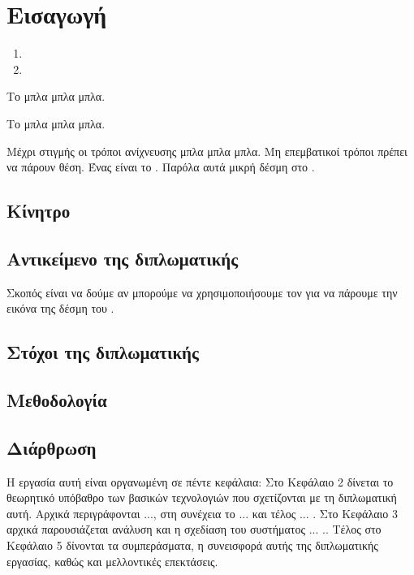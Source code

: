 \chapter{Εισαγωγή}

\begin{enumerate}
\item {}
\item {}
\end{enumerate}

Το  μπλα μπλα μπλα.

Το  μπλα μπλα μπλα.

Μέχρι στιγμής οι τρόποι ανίχνευσης μπλα μπλα μπλα.
Μη επεμβατικοί τρόποι πρέπει να πάρουν θέση. Ένας είναι το . Παρόλα αυτά μικρή δέσμη στο . 

\section{Κίνητρο}


\section{Αντικείμενο της διπλωματικής} %
Σκοπός είναι να δούμε αν μπορούμε να χρησιμοποιήσουμε τον  για να πάρουμε την εικόνα της δέσμη του .

\section{Στόχοι της διπλωματικής}

\section{Μεθοδολογία}

\section{Διάρθρωση} %
Η εργασία αυτή είναι οργανωμένη σε πέντε κεφάλαια: Στο Κεφάλαιο 2
δίνεται το θεωρητικό υπόβαθρο των βασικών τεχνολογιών που
σχετίζονται με τη διπλωματική αυτή. Αρχικά περιγράφονται ..., στη συνέχεια το ... και τέλος ... . 
Στο Κεφάλαιο 3 αρχικά παρουσιάζεται ανάλυση και η σχεδίαση του συστήματος ... .. Τέλος στο Κεφάλαιο 5 δίνονται τα συμπεράσματα, η συνεισφορά αυτής της
διπλωματικής εργασίας, καθώς και μελλοντικές επεκτάσεις.

